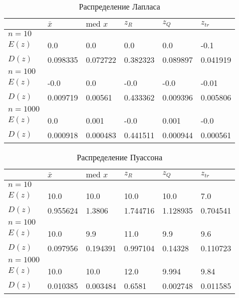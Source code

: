 \documentclass[12pt,a4paper]{article}
\begin{document}
\begin{table}[h!]
	\centering
	\begin{tabular}{|l|l|l|l|l|l|}
		\hline&$\bar x$ &$\text{med }x$  &$z_R$  &$z_Q$  &$z_{tr}$  \\ \hline
		$n=10$&&&&& \\ \hline$E(z)$&0.0&0.0&0.0&0.0&-0.1 \\ \hline$D(z)$&0.098335&0.072722&0.382323&0.089897&0.041919 \\ \hline
		
		$n=100$&&&&& \\ \hline$E(z)$&-0.0&0.0&-0.0&-0.0&-0.01 \\ \hline$D(z)$&0.009719&0.00561&0.433362&0.009396&0.005806 \\ \hline
		
		$n=1000$&&&&& \\ \hline$E(z)$&0.0&0.001&-0.0&0.001&-0.0 \\ \hline$D(z)$&0.000918&0.000483&0.441511&0.000944&0.000561 \\ \hline
	\end{tabular}
	\caption{Распределение Лапласа}
\end{table}

\pagebreak

\begin{table}[h!]
	\centering
	\begin{tabular}{|l|l|l|l|l|l|}
		\hline&$\bar x$ &$\text{med }x$  &$z_R$  &$z_Q$  &$z_{tr}$  \\ \hline
		$n=10$&&&&& \\ \hline$E(z)$&10.0&10.0&10.0&10.0&7.0 \\ \hline$D(z)$&0.955624&1.3806&1.744716&1.128935&0.704541 \\ \hline
		
		$n=100$&&&&& \\ \hline$E(z)$&10.0&9.9&11.0&9.9&9.6 \\ \hline$D(z)$&0.097956&0.194391&0.997104&0.14328&0.110723 \\ \hline
		
		$n=1000$&&&&& \\ \hline$E(z)$&10.0&10.0&12.0&9.994&9.84 \\ \hline$D(z)$&0.010385&0.003484&0.6581&0.002748&0.011585 \\ \hline
	\end{tabular}
	\caption{Распределение Пуассона}
\end{table}
\end{document}
